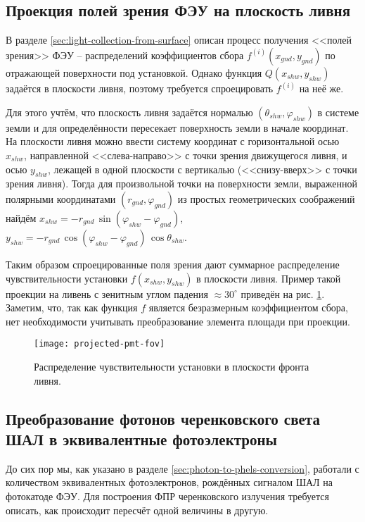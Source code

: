 \subsection{Проекция полей зрения ФЭУ на плоскость ливня}

В разделе \ref{sec:light-collection-from-surface} описан процесс получения <<полей зрения>> ФЭУ -- распределений коэффициентов сбора $f^{(i)}(x_{gnd}, y_{gnd})$ по отражающей поверхности под установкой. Однако функция $Q(x_{shw}, y_{shw})$ задаётся в плоскости ливня, поэтому требуется спроецировать $f^{(i)}$ на неё же.

Для этого учтём, что плоскость ливня задаётся нормалью $(\theta_{shw}, \varphi_{shw})$ в системе земли и для определённости пересекает поверхность земли в начале координат. На плоскости ливня можно ввести систему координат с горизонтальной осью $x_{shw}$, направленной <<слева-направо>> с точки зрения движущегося ливня, и осью $y_{shw}$, лежащей в одной плоскости с вертикалью (<<снизу-вверх>> с точки зрения ливня). Тогда для произвольной точки на поверхности земли, выраженной полярными координатами $(r_{gnd}, \varphi_{gnd})$ из простых геометрических соображений найдём $x_{shw} = - r_{gnd} \, \sin (\varphi_{shw} - \varphi_{gnd})$, $y_{shw} = - r_{gnd} \, \cos (\varphi_{shw} - \varphi_{gnd}) \, \cos \theta_{shw}$.

Таким образом спроецированные поля зрения дают суммарное распределение чувствительности установки $f(x_{shw}, y_{shw})$ в плоскости ливня. Пример такой проекции на ливень с зенитным углом падения $\approx 30^{\circ}$ приведён на рис. \ref{pic:projected-pmt-fov}. Заметим, что, так как функция $f$ является безразмерным коэффициентом сбора, нет необходимости учитывать преобразование элемента площади при проекции.

\begin{figure}
	\centering
	\texttt{[image: projected-pmt-fov]}
	\caption{Распределение чувствительности установки в плоскости фронта ливня.}
	\label{pic:projected-pmt-fov}
\end{figure}

\subsection{Преобразование фотонов черенковского света ШАЛ в эквивалентные фотоэлектроны}

До сих пор мы, как указано в разделе \ref{sec:photon-to-phels-conversion}, работали с количеством эквивалентных фотоэлектронов, рождённых сигналом ШАЛ на фотокатоде ФЭУ. Для построения ФПР черенковского излучения требуется описать, как происходит пересчёт одной величины в другую.

